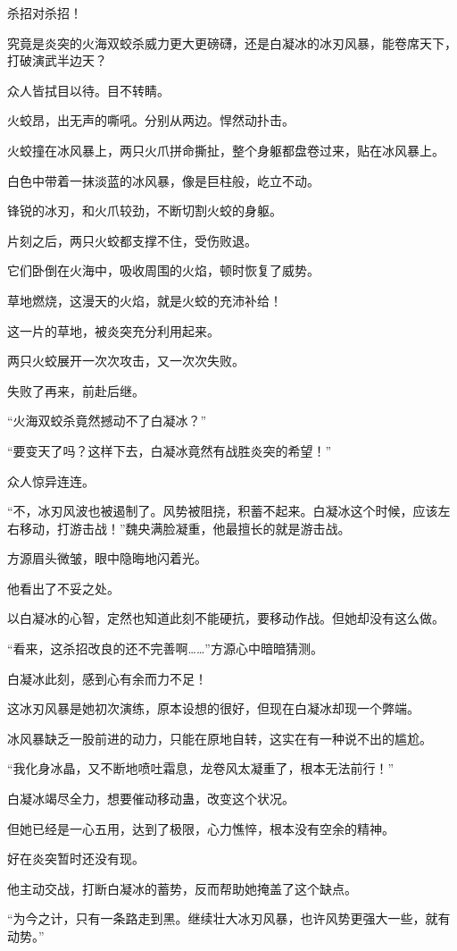 \begin{this_body}
杀招对杀招！

究竟是炎突的火海双蛟杀威力更大更磅礴，还是白凝冰的冰刃风暴，能卷席天下，打破演武半边天？

众人皆拭目以待。目不转睛。

火蛟昂，出无声的嘶吼。分别从两边。悍然动扑击。

火蛟撞在冰风暴上，两只火爪拼命撕扯，整个身躯都盘卷过来，贴在冰风暴上。

白色中带着一抹淡蓝的冰风暴，像是巨柱般，屹立不动。

锋锐的冰刃，和火爪较劲，不断切割火蛟的身躯。

片刻之后，两只火蛟都支撑不住，受伤败退。

它们卧倒在火海中，吸收周围的火焰，顿时恢复了威势。

草地燃烧，这漫天的火焰，就是火蛟的充沛补给！

这一片的草地，被炎突充分利用起来。

两只火蛟展开一次次攻击，又一次次失败。

失败了再来，前赴后继。

“火海双蛟杀竟然撼动不了白凝冰？”

“要变天了吗？这样下去，白凝冰竟然有战胜炎突的希望！”

众人惊异连连。

“不，冰刃风波也被遏制了。风势被阻挠，积蓄不起来。白凝冰这个时候，应该左右移动，打游击战！”魏央满脸凝重，他最擅长的就是游击战。

方源眉头微皱，眼中隐晦地闪着光。

他看出了不妥之处。

以白凝冰的心智，定然也知道此刻不能硬抗，要移动作战。但她却没有这么做。

“看来，这杀招改良的还不完善啊……”方源心中暗暗猜测。

白凝冰此刻，感到心有余而力不足！

这冰刃风暴是她初次演练，原本设想的很好，但现在白凝冰却现一个弊端。

冰风暴缺乏一股前进的动力，只能在原地自转，这实在有一种说不出的尴尬。

“我化身冰晶，又不断地喷吐霜息，龙卷风太凝重了，根本无法前行！”

白凝冰竭尽全力，想要催动移动蛊，改变这个状况。

但她已经是一心五用，达到了极限，心力憔悴，根本没有空余的精神。

好在炎突暂时还没有现。

他主动交战，打断白凝冰的蓄势，反而帮助她掩盖了这个缺点。

“为今之计，只有一条路走到黑。继续壮大冰刃风暴，也许风势更强大一些，就有动势。”


\end{this_body}
